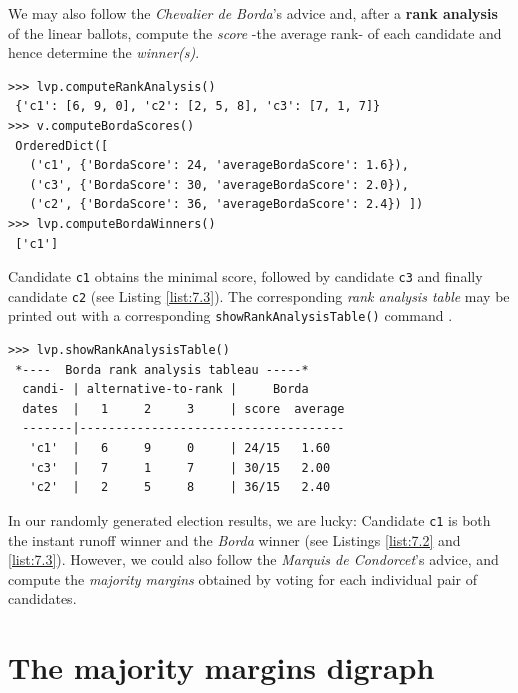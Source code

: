 We may also follow the \emph{Chevalier de Borda}'s advice and, after a \textbf{rank analysis} of the linear ballots, compute the \Borda \emph{score} -the average rank- of each candidate and hence determine the \Borda \emph{winner(s)}.
\begin{lstlisting}[caption={Example of \Borda rank scores},label=list:7.3]
>>> lvp.computeRankAnalysis()
 {'c1': [6, 9, 0], 'c2': [2, 5, 8], 'c3': [7, 1, 7]}
>>> v.computeBordaScores()
 OrderedDict([
   ('c1', {'BordaScore': 24, 'averageBordaScore': 1.6}),
   ('c3', {'BordaScore': 30, 'averageBordaScore': 2.0}),
   ('c2', {'BordaScore': 36, 'averageBordaScore': 2.4}) ])
>>> lvp.computeBordaWinners()
 ['c1']
\end{lstlisting}
Candidate \texttt{c1} obtains the minimal \Borda score, followed by candidate \texttt{c3} and finally candidate \texttt{c2} (see Listing \ref{list:7.3}). The corresponding \Borda \emph{rank analysis table} may be printed out with a corresponding \texttt{showRankAnalysisTable()} command .
\begin{lstlisting}[caption={Rank analysis example},label=list:7.4]
>>> lvp.showRankAnalysisTable()
 *----  Borda rank analysis tableau -----*
  candi- | alternative-to-rank |     Borda
  dates  |   1     2     3     | score  average
  -------|-------------------------------------
   'c1'  |   6     9     0     | 24/15   1.60
   'c3'  |   7     1     7     | 30/15   2.00
   'c2'  |   2     5     8     | 36/15   2.40
 \end{lstlisting}

In our randomly generated election results, we are lucky: Candidate \texttt{c1} is both the instant runoff winner and the \emph{Borda} winner (see Listings \ref{list:7.2} and \ref{list:7.3}). However, we could also follow the \emph{Marquis de Condorcet}'s advice, and compute the \emph{majority margins} obtained by voting for each individual pair of candidates.

\section{The majority margins digraph}
\label{sec:7.3}

